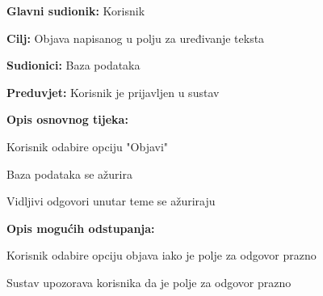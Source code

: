 					\noindent {}
					\begin{packed_item}
	
						\item \textbf{Glavni sudionik: }Korisnik
						\item  \textbf{Cilj:} Objava napisanog u polju za uređivanje teksta
						\item  \textbf{Sudionici:} Baza podataka
						\item  \textbf{Preduvjet:} Korisnik je prijavljen u sustav
						\item  \textbf{Opis osnovnog tijeka:}
						
						\item[] \begin{packed_enum}
	
							\item Korisnik odabire opciju "Objavi" 
							\item Baza podataka se ažurira
							\item Vidljivi odgovori unutar teme se ažuriraju
							
							
						\end{packed_enum}
						\item  \textbf{Opis mogućih odstupanja:}
						
						\item[] \begin{packed_item}
						\item[2.a] Korisnik odabire opciju objava iako je polje za odgovor prazno
							\item[] \begin{packed_enum}
								
								\item Sustav upozorava korisnika da je polje za odgovor prazno
								
							\end{packed_enum}
						\end{packed_item}
						
						
					\end{packed_item}					
										
